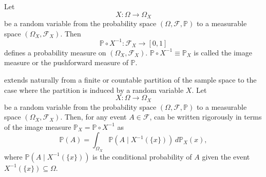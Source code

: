 \begin{definition}
	\label{def:image_measure}
	Let 
	\begin{equation}
		X\colon \Omega \to \Omega_X
	\end{equation}
	be a random variable from the probability space $(\Omega, \mathcal{F}, \mathbb{P})$ to a measurable space $(\Omega_X, \mathcal{F}_X)$. Then~\cite{drewitz2019introduction}
	\begin{equation}
		\mathbb{P}\circ X^{-1}\colon \mathcal{F}_X\to [0,1]
	\end{equation}
	defines a probability measure on $(\Omega_X, \mathcal{F}_X)$. $\mathbb{P}\circ X^{-1} \equiv \mathbb{P}_X$ is called the image measure or the pushforward measure of $\mathbb{P}$.
\end{definition}

\begin{remark}
	\label{remark:marginalization}
	 extends naturally from a finite or countable partition of the sample space to the case where the partition is induced by a random variable $X$. Let
	\begin{equation}
		X\colon \Omega \to \Omega_X
	\end{equation}
	be a random variable from the probability space $(\Omega, \mathcal{F}, \mathbb{P})$ to a measurable space $(\Omega_X, \mathcal{F}_X)$. Then, for any event $A \in \mathcal{F}$,  can be written rigorously in terms of the image measure $\mathbb{P}_X = \mathbb{P} \circ X^{-1}$ as
	\begin{equation}
		\mathbb{P}(A) = \int_{\Omega_X} \mathbb{P}(A \mid X^{-1}(\{x\})) \, d\mathbb{P}_X(x),
	\end{equation}
	where $\mathbb{P}(A \mid X^{-1}(\{x\}))$ is the conditional probability of $A$ given the event $X^{-1}(\{x\}) \subseteq \Omega$. 
\end{remark}

